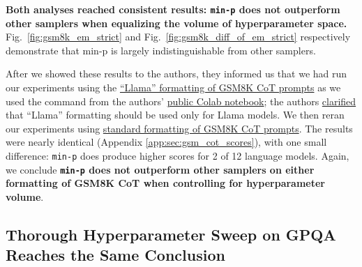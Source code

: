 \textbf{Both analyses reached consistent results: \texttt{min-p} does not outperform other samplers when equalizing the volume of hyperparameter space.}
Fig.~\ref{fig:gsm8k_em_strict} and Fig.~\ref{fig:gsm8k_diff_of_em_strict} respectively demonstrate that min-p is largely indistinguishable from other samplers.

After we showed these results to the authors, they informed us that we had run our experiments using the \href{https://github.com/EleutherAI/lm-evaluation-harness/blob/main/lm_eval/tasks/gsm8k/gsm8k-cot-llama.yaml}{``Llama''
formatting of GSM8K CoT prompts} as we used the command from the authors'
\href{https://github.com/menhguin/minp_paper/blob/main/%5BPUBLIC%5D_Min_P_Evals_Replication_for_GPQA_and_GSM8K_COT.ipynb}{public Colab notebook};
the authors \href{https://github.com/menhguin/minp_paper/commit/9ca63687df807b4276c527b9b47e65379c1b0bd6}{clarified} that ``Llama'' formatting should be used only for Llama models.
We then reran our experiments using \href{https://github.com/EleutherAI/lm-evaluation-harness/blob/main/lm_eval/tasks/gsm8k/gsm8k-cot.yaml}{standard formatting of GSM8K CoT prompts}.
The results were nearly identical (Appendix \ref{app:sec:gsm_cot_scores}), with one small difference: \texttt{min-p} does produce higher scores for 2 of 12 language models.
Again, we conclude \textbf{\texttt{min-p} does not outperform other samplers on either formatting of GSM8K CoT when controlling for hyperparameter volume}.

\subsection{Thorough Hyperparameter Sweep on GPQA Reaches the Same Conclusion}
\label{sec:nlp_evals:subsec:gpqa}

